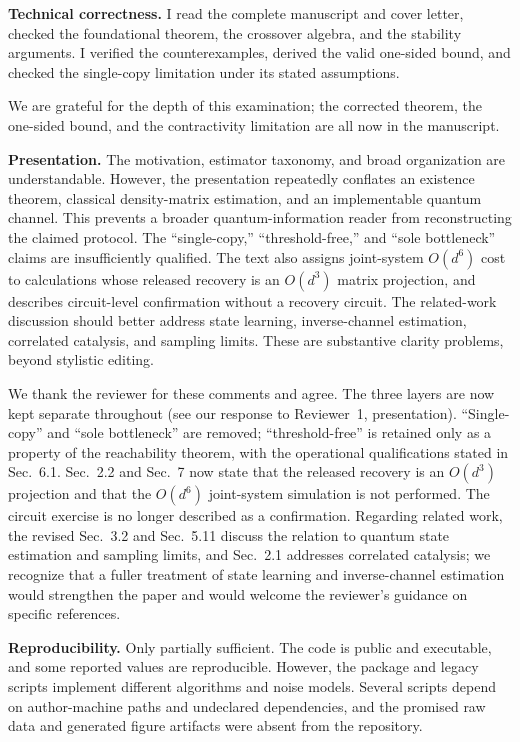 \documentclass[11pt,a4paper]{article}
\newcommand{\rev}[1]{{\color{black}#1}}
\newcommand{\resp}[1]{{\color{red}#1}}
\begin{document}
\rev{\textbf{Technical correctness.} I read the complete manuscript and cover letter, checked the foundational theorem, the crossover algebra, and the stability arguments. I verified the counterexamples, derived the valid one-sided bound, and checked the single-copy limitation under its stated assumptions.}

\resp{We are grateful for the depth of this examination; the corrected theorem, the one-sided bound, and the contractivity limitation are all now in the manuscript.}

\rev{\textbf{Presentation.} The motivation, estimator taxonomy, and broad organization are understandable. However, the presentation repeatedly conflates an existence theorem, classical density-matrix estimation, and an implementable quantum channel. This prevents a broader quantum-information reader from reconstructing the claimed protocol. The ``single-copy,'' ``threshold-free,'' and ``sole bottleneck'' claims are insufficiently qualified. The text also assigns joint-system $O(d^6)$ cost to calculations whose released recovery is an $O(d^3)$ matrix projection, and describes circuit-level confirmation without a recovery circuit. The related-work discussion should better address state learning, inverse-channel estimation, correlated catalysis, and sampling limits. These are substantive clarity problems, beyond stylistic editing.}

\resp{We thank the reviewer for these comments and agree. The three layers are now kept separate throughout (see our response to Reviewer~1, presentation). ``Single-copy'' and ``sole bottleneck'' are removed; ``threshold-free'' is retained only as a property of the reachability theorem, with the operational qualifications stated in Sec.~6.1. Sec.~2.2 and Sec.~7 now state that the released recovery is an $O(d^3)$ projection and that the $O(d^6)$ joint-system simulation is not performed. The circuit exercise is no longer described as a confirmation. Regarding related work, the revised Sec.~3.2 and Sec.~5.11 discuss the relation to quantum state estimation and sampling limits, and Sec.~2.1 addresses correlated catalysis; we recognize that a fuller treatment of state learning and inverse-channel estimation would strengthen the paper and would welcome the reviewer's guidance on specific references.}

\rev{\textbf{Reproducibility.} Only partially sufficient. The code is public and executable, and some reported values are reproducible. However, the package and legacy scripts implement different algorithms and noise models. Several scripts depend on author-machine paths and undeclared dependencies, and the promised raw data and generated figure artifacts were absent from the repository.}
\end{document}

